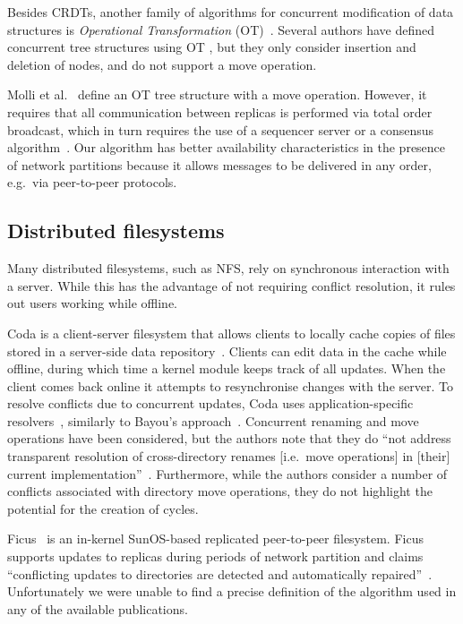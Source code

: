 \documentclass[sigplan,anonymous]{acmart}
\begin{document}
Besides CRDTs, another family of algorithms for concurrent modification of data structures is \emph{Operational Transformation} (OT)~\cite{Sun:1998vf}.
Several authors have defined concurrent tree structures using OT \cite{Jungnickel:2016cb,Ignat:2003jy,Davis:2002iv}, but they only consider insertion and deletion of nodes, and do not support a move operation.

Molli et al.~\cite{Molli:2003cd} define an OT tree structure with a move operation.
However, it requires that all communication between replicas is performed via total order broadcast, which in turn requires the use of a sequencer server or a consensus algorithm~\cite{Chandra:1996cp}.
Our algorithm has better availability characteristics in the presence of network partitions because it allows messages to be delivered in any order, e.g.\ via peer-to-peer protocols.

\subsection{Distributed filesystems}\label{sec:filesystems}

Many distributed filesystems, such as NFS, rely on synchronous interaction with a server.
While this has the advantage of not requiring conflict resolution, it rules out users working while offline.

Coda is a client-server filesystem that allows clients to locally cache copies of files stored in a server-side data repository~\cite{kistler1992coda}. 
Clients can edit data in the cache while offline, during which time a kernel module keeps track of all updates. 
When the client comes back online it attempts to resynchronise changes with the server. 
To resolve conflicts due to concurrent updates, Coda uses application-specific resolvers~\cite{Kumar:1995wf}, similarly to Bayou's approach~\cite{Terry:1995dn}.
Concurrent renaming and move operations have been considered, but the authors note that they do ``not address transparent resolution of cross-directory renames [i.e.\ move operations] in [their] current implementation''~\cite{kumar1993log}.
Furthermore, while the authors consider a number of conflicts associated with directory move operations, they do not highlight the potential for the creation of cycles.

Ficus~\cite{Reiher:1994wh} is an in-kernel SunOS-based replicated peer-to-peer filesystem. 
Ficus supports updates to replicas during periods of network partition and claims ``conflicting updates to directories are detected and automatically repaired''~\cite{guy1990implementation}. 
Unfortunately we were unable to find a precise definition of the algorithm used in any of the available publications. 
\end{document}

